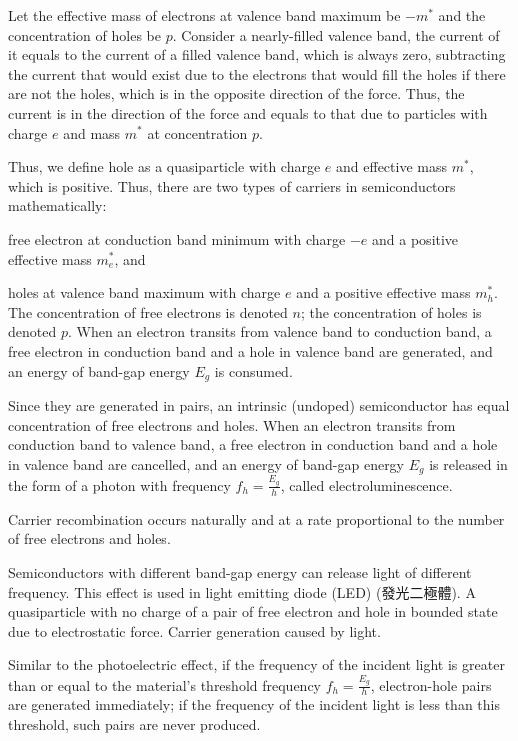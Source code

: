 \documentclass[a4paper,12pt]{article}
\begin{document}
Let the effective mass of electrons at valence band maximum be $-m^*$ and the concentration of holes be $p$. Consider a nearly-filled valence band, the current of it equals to the current of a filled valence band, which is always zero, subtracting the current that would exist due to the electrons that would fill the holes if there are not the holes, which is in the opposite direction of the force. Thus, the current is in the direction of the force and equals to that due to particles with charge $e$ and mass $m^*$ at concentration $p$.

Thus, we define hole as a quasiparticle with charge $e$ and effective mass $m^*$, which is positive.
Thus, there are two types of carriers in semiconductors mathematically:
\bit
\item free electron at conduction band minimum with charge $-e$ and a positive effective mass $m_e^*$, and
\item holes at valence band maximum with charge $e$ and a positive effective mass $m_h^*$.
\eit
The concentration of free electrons is denoted $n$; the concentration of holes is denoted $p$.
When an electron transits from valence band to conduction band, a free electron in conduction band and a hole in valence band are generated, and an energy of band-gap energy $E_g$ is consumed.

Since they are generated in pairs, an intrinsic (undoped) semiconductor has equal concentration of free electrons and holes.
When an electron transits from conduction band to valence band, a free electron in conduction band and a hole in valence band are cancelled, and an energy of band-gap energy $E_g$ is released in the form of a photon with frequency $f_h=\frac{E_g}{h}$, called electroluminescence.

Carrier recombination occurs naturally and at a rate proportional to the number of free electrons and holes.

Semiconductors with different band-gap energy can release light of different frequency. This effect is used in light emitting diode (LED) (發光二極體).
A quasiparticle with no charge of a pair of free electron and hole in bounded state due to electrostatic force.
Carrier generation caused by light.

Similar to the photoelectric effect, if the frequency of the incident light is greater than or equal to the material's threshold frequency $f_h=\frac{E_g}{h}$, electron-hole pairs are generated immediately; if the frequency of the incident light is less than this threshold, such pairs are never produced.
\end{document}
